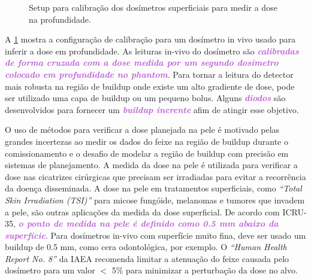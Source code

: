 \documentclass[11pt,a4paper]{article}
\newcounter{exemplo}
\begin{document}
	\begin{figure}
		\centering
		\caption{Setup para calibração dos dosímetros superficiais para medir a dose na profundidade.}
		\label{fig:setupCalibracaoDosimInVivo}
	\end{figure}

	A \ref{fig:setupCalibracaoDosimInVivo} mostra a configuração de calibração para um dosímetro in vivo usado para inferir a dose em profundidade. As leituras in-vivo do dosímetro são \textcolor{MediumOrchid}{\textbf{\textit{calibradas de forma cruzada com a dose medida por um segundo dosímetro colocado em profundidade no phantom}}}. Para tornar a leitura do detector mais robusta na região de buildup onde existe um alto gradiente de dose, pode ser utilizado uma capa de buildup ou um pequeno bolus. Alguns \textcolor{MediumOrchid}{\textbf{\textit{diodos}}} são desenvolvidos para fornecer um \textcolor{MediumOrchid}{\textbf{\textit{buildup inerente}}} afim de atingir esse objetivo.

	O uso de métodos para verificar a dose planejada na pele é motivado pelas grandes incertezas ao medir os dados do feixe na região de buildup durante o comissionamento e o desafio de modelar a região de buildup com precisão em sistemas de planejamento. A medida da dose na pele é utilizada para verificar a dose nas cicatrizes cirúrgicas que precisam ser irradiadas para evitar a recorrência da doença disseminada. A dose na pele em tratamentos superficiais, como \textit{``Total Skin Irradiation (TSI)''} para micose fungóide, melanomas e tumores que invadem a pele, são outras aplicações da medida da dose superficial. De acordo com ICRU-35, \textcolor{MediumOrchid}{\textbf{\textit{o ponto de medida na pele é definido como 0.5 mm abaixo da superfície}}}. Para dosímetros in-vivo com superfície muito fina, deve ser usado um buildup de 0.5 mm, como cera odontológica, por exemplo. O \textit{``Human Health Report No. 8''} da IAEA recomenda limitar a atenuação do feixe causada pelo dosímetro para um valor $<$ 5\% para minimizar a perturbação da dose no alvo.
\end{document}
